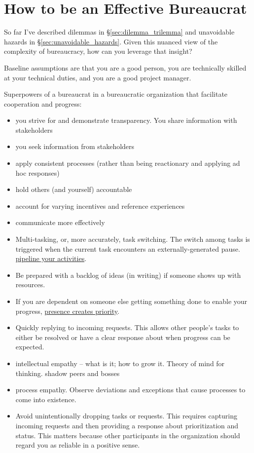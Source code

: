 \section{How to be an Effective Bureaucrat\label{sec:effective_bureaucrat}}

So far I've described dilemmas in \S\ref{sec:dilemma_trilemma} and unavoidable hazards in \S\ref{sec:unavoidable_hazards}. Given this nuanced view of the complexity of bureaucracy, how can you leverage that insight?

Baseline assumptions are that you are a good person, you are technically skilled at your technical duties, and you are a good project manager. 


Superpowers of a bureaucrat in a bureaucratic organization that facilitate cooperation and progress:

\begin{itemize}
\item you strive for and demonstrate transparency. You share information with stakeholders
\item you seek information from stakeholders
\item apply consistent processes (rather than being reactionary and applying ad hoc responses)
\item hold others (and yourself) accountable 
\item account for varying incentives and reference experiences
    \item communicate more effectively
    \item Multi-tasking, or, more accurately, task switching. The switch among tasks is triggered when the current task encounters an externally-generated pause. \href{https://en.wikipedia.org/wiki/Pipeline_(computing)#Concept_and_motivation}{pipeline your activities}.
    \item Be prepared with a backlog of ideas (in writing) if someone shows up with resources.
    \item If you are dependent on someone else getting something done to enable your progress, \underline{presence creates priority}.
    \item Quickly replying to incoming requests. This allows other people's tasks to either be resolved or have a clear response about when progress can be expected. 
    \item intellectual empathy -- what is it; how to grow it. Theory of mind for thinking. shadow peers and bosses
    \item process empathy. Observe deviations and exceptions that cause processes to come into existence. 
    \item Avoid unintentionally dropping tasks or requests. This requires capturing incoming requests and then providing a response about prioritization and status. This matters because other participants in the organization should regard you as reliable in a positive sense. 
\end{itemize}


